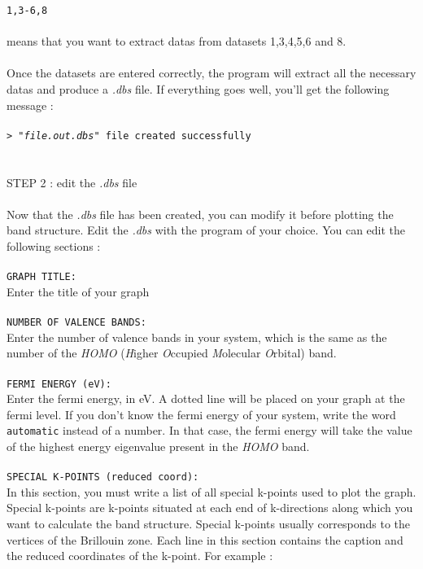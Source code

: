 \documentclass{article}
\begin{document}
\texttt{1,3-6,8} \\
\\
means that you want to extract datas from datasets 1,3,4,5,6 and 8. \\
\\
Once the datasets are entered correctly, the program will extract all the necessary datas and produce a \textit{.dbs} file. If everything goes well, you'll get the following message : \\
\\
\texttt{> "\textit{file.out.dbs}"  file created successfully} \\
\\
\\
{\large{STEP 2 : edit the \textit{.dbs} file}} \\
\\
Now that the \textit{.dbs} file has been created, you can modify it before plotting the band structure. Edit the \textit{.dbs} with the program of your choice.
You can edit the following sections : \\
\\
\texttt{GRAPH TITLE:} \\
Enter the title of your graph \\
\\
\texttt{NUMBER OF VALENCE BANDS:} \\
Enter the number of valence bands in your system, which is the same as the number of the \textit{HOMO} (\textit{H}igher \textit{O}ccupied \textit{M}olecular \textit{O}rbital) band. \\
\\
\texttt{FERMI ENERGY (eV):} \\
Enter the fermi energy, in eV. A dotted line will be placed on your graph at the fermi level. If you don't know the fermi energy of your system, write the word \texttt{automatic} instead of a number. In that case, the fermi energy will take the value of the highest energy eigenvalue present in the \textit{HOMO} band. \\
\\
\texttt{SPECIAL K-POINTS (reduced coord):} \\
In this section, you must write a list of all special k-points used to plot the graph. Special k-points are k-points situated at each end of k-directions along which you want to calculate the band structure. Special k-points usually corresponds to the vertices of the Brillouin zone. Each line in this section contains the caption and the reduced coordinates of the k-point. For example : \\
\end{document}
